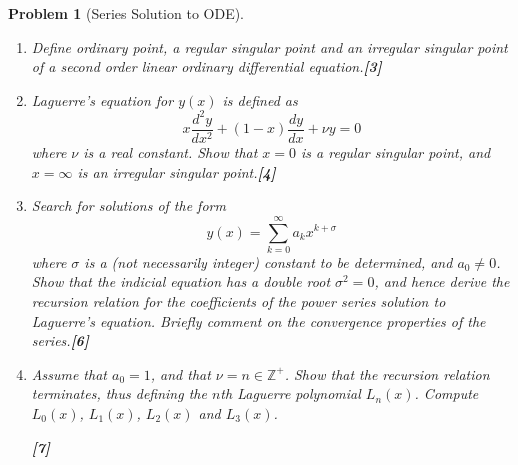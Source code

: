 \documentclass[a4paper]{article}
\theoremstyle{new}
\newtheorem{qns}{Problem}[section]
\begin{document}
\newpage
\begin{qns}[Series Solution to ODE]\leavevmode
\begin{enumerate}[label=(\alph*)]
\item Define ordinary point, a regular singular point and an irregular singular point of a second order linear ordinary differential equation.\hfill \textbf{[3]}
\item Laguerre's equation for $y(x)$ is defined as
$$x\frac{d^2y}{dx^2}+(1-x)\frac{dy}{dx}+\nu y=0$$
where $\nu$ is a real constant. Show that $x=0$ is a regular singular point, and $x=\infty$ is an irregular singular point.\hfill \textbf{[4]}
\item Search for solutions of the form $$y(x)=\sum_{k=0}^\infty a_kx^{k+\sigma}$$
where $\sigma$ is a (not necessarily integer) constant to be determined, and $a_0\neq 0$. Show that the indicial equation has a double root $\sigma^2=0$, and hence derive the recursion relation for the coefficients of the power series solution to Laguerre's equation. Briefly comment on the convergence properties of the series.\hfill \textbf{[6]}
\item Assume that $a_0=1$, and that $\nu=n\in\mathbb{Z}^+$. Show that the recursion relation terminates, thus defining the $n$th Laguerre polynomial $L_n(x)$. Compute $L_0(x)$, $L_1(x)$, $L_2(x)$ and $L_3(x)$.

\hfill \textbf{[7]}
\end{enumerate}
\end{qns}
\end{document}
